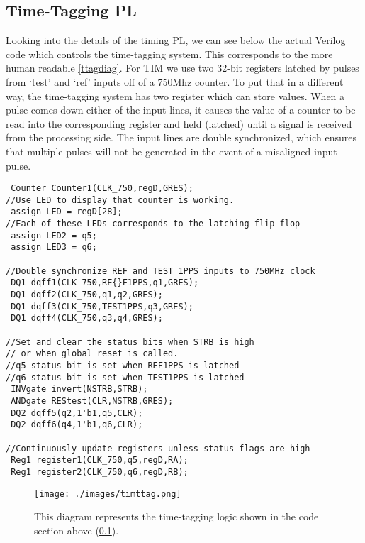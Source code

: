 \subsection{Time-Tagging PL}
\label{ttpl}
Looking into the details of the timing PL, we can see below the actual Verilog code which controls the time-tagging system. This corresponds to the more human readable \autoref{ttagdiag}. For TIM we use two 32-bit registers latched by pulses from `test' and `ref' inputs off of a 750Mhz counter. To put that in a different way, the time-tagging system has two register which can store values. When a pulse comes down either of the input lines, it causes the value of a counter to be read into the corresponding register and held (latched) until a signal is received from the processing side. The input lines are double synchronized, which ensures that multiple pulses will not be generated in the event of a misaligned input pulse.
\begin{small}
\begin{singlespace}
\begin{verbatim}
 Counter Counter1(CLK_750,regD,GRES);
//Use LED to display that counter is working.
 assign LED = regD[28];
//Each of these LEDs corresponds to the latching flip-flop
 assign LED2 = q5;
 assign LED3 = q6;

//Double synchronize REF and TEST 1PPS inputs to 750MHz clock
 DQ1 dqff1(CLK_750,RE{}F1PPS,q1,GRES);
 DQ1 dqff2(CLK_750,q1,q2,GRES);
 DQ1 dqff3(CLK_750,TEST1PPS,q3,GRES);
 DQ1 dqff4(CLK_750,q3,q4,GRES);

//Set and clear the status bits when STRB is high
// or when global reset is called.
//q5 status bit is set when REF1PPS is latched
//q6 status bit is set when TEST1PPS is latched
 INVgate invert(NSTRB,STRB);
 ANDgate REStest(CLR,NSTRB,GRES);
 DQ2 dqff5(q2,1'b1,q5,CLR);
 DQ2 dqff6(q4,1'b1,q6,CLR);

//Continuously update registers unless status flags are high
 Reg1 register1(CLK_750,q5,regD,RA);
 Reg1 register2(CLK_750,q6,regD,RB);
\end{verbatim}
\end{singlespace}
\end{small}

\begin{figure}[H]
\centering
\texttt{[image: ./images/timttag.png]}
\caption[TIM Time-Tagging PL]{This diagram represents the time-tagging logic shown in the code section above (\ref{ttpl}).}
\label{ttagdiag}
\end{figure}

